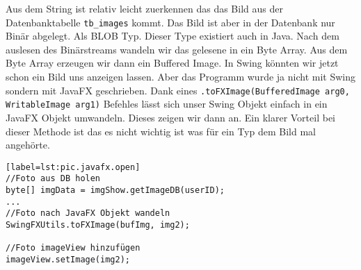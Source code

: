 Aus dem String ist relativ leicht zuerkennen das das Bild aus der Datenbanktabelle \texttt{tb\_images} kommt. Das Bild ist aber in der Datenbank nur Binär abgelegt. Als BLOB Typ. Dieser Type existiert auch in Java. Nach dem auslesen des Binärstreams wandeln wir das gelesene in ein Byte Array. Aus dem Byte Array erzeugen wir dann ein Buffered Image. In Swing könnten wir jetzt schon ein Bild uns anzeigen lassen. Aber das Programm wurde ja nicht mit Swing sondern mit JavaFX geschrieben. Dank eines \texttt{.toFXImage(BufferedImage arg0, WritableImage arg1)} Befehles lässt sich unser Swing Objekt einfach in ein JavaFX Objekt umwandeln. Dieses zeigen wir dann an. Ein klarer Vorteil bei dieser Methode ist das es nicht wichtig ist was für ein Typ dem Bild mal angehörte.
\begin{lstlisting}[caption={JavaFX Foto öffnen},captionpos=b][label=lst:pic.javafx.open]
//Foto aus DB holen
byte[] imgData = imgShow.getImageDB(userID);
...
//Foto nach JavaFX Objekt wandeln
SwingFXUtils.toFXImage(bufImg, img2);

//Foto imageView hinzufügen
imageView.setImage(img2);
\end{lstlisting}
